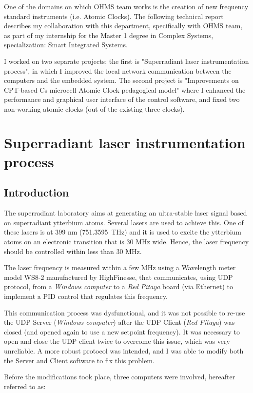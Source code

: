 \documentclass[a4paper,12pt]{article}
\begin{document}
One of the domains on which OHMS team works is the creation of new frequency standard instruments (i.e. Atomic Clocks). The following technical report describes my collaboration with this department, specifically with OHMS team, as part of my internship for the Master 1 degree in Complex Systems, specialization: Smart Integrated Systems.

I worked on two separate projects; the first is "Superradiant laser instrumentation process", in which I improved the local network communication between the computers and the embedded system. The second project is "Improvements on CPT-based Cs microcell Atomic Clock pedagogical model" where I enhanced the performance and graphical user interface of the control software, and fixed two non-working atomic clocks (out of the existing three clocks).

\section{Superradiant laser instrumentation process}
\subsection{Introduction}
The superradiant laboratory aims at generating an ultra-stable laser signal based on superradiant ytterbium atoms. Several lasers are used to achieve this. One of these lasers is at 399 nm (\mbox{751.3595 THz}) and it is used to excite the ytterbium atoms on an electronic transition that is 30 MHz wide. Hence, the laser frequency should be controlled within less than 30 MHz.

The laser frequency is measured within a few MHz using a Wavelength meter model WS8-2 manufactured by HighFinesse, that communicates, using UDP protocol, from a \textit{Windows computer} to a \textit{Red Pitaya} board (via Ethernet) to implement a PID control that regulates this frequency.

This communication process was dysfunctional, and it was not possible to re-use the UDP Server (\textit{Windows computer}) after the UDP Client (\textit{Red Pitaya}) was closed (and opened again to use a new setpoint frequency). It was necessary to open and close the UDP client twice to overcome this issue, which was very unreliable. A more robust protocol was intended, and I was able to modify both the Server and Client software to fix this problem.

Before the modifications took place, three computers were involved, hereafter referred to as:
\end{document}
